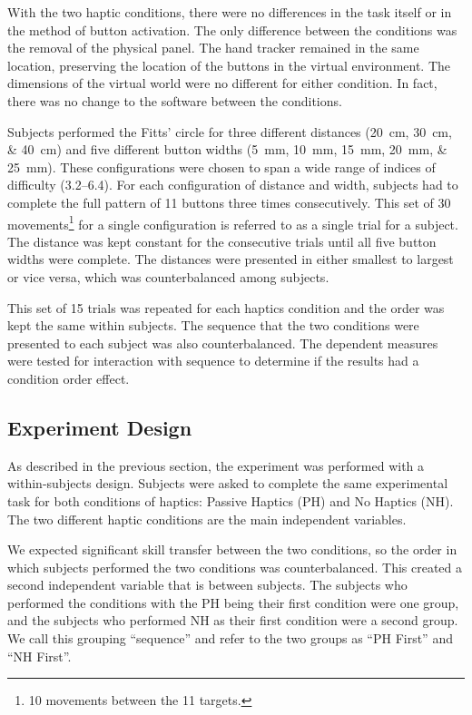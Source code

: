 With the two haptic conditions, there were no differences in the task itself or in the method of button activation.
The only difference between the conditions was the removal of the physical panel.
The hand tracker remained in the same location, preserving the location of the buttons in the virtual environment.
The dimensions of the virtual world were no different for either condition.
In fact, there was no change to the software between the conditions.

Subjects performed the Fitts' circle for three different distances (\SIlist{20;30;40}{\centi\meter}) and five different button widths (\SIlist{5;10;15;20;25}{\milli\meter}).
These configurations were chosen to span a wide range of indices of difficulty (\numrange{3.2}{6.4}).
For each configuration of distance and width, subjects had to complete the full pattern of 11 buttons three times consecutively.
This set of 30 movements\footnote{10 movements between the 11 targets.} for a single configuration is referred to as a single trial for a subject.
The distance was kept constant for the consecutive trials until all five button widths were complete.
The distances were presented in either smallest to largest or vice versa, which was counterbalanced among subjects.

This set of 15 trials was repeated for each haptics condition and the order was kept the same within subjects.
The sequence that the two conditions were presented to each subject was also counterbalanced.
The dependent measures were tested for interaction with sequence to determine if the results had a condition order effect.

\subsection{Experiment Design}

As described in the previous section, the experiment was performed with a within-subjects design.
Subjects were asked to complete the same experimental task for both conditions of haptics: Passive Haptics (PH) and No Haptics (NH).
The two different haptic conditions are the main independent variables.

We expected significant skill transfer between the two conditions, so the order in which subjects performed the two conditions was counterbalanced.
This created a second independent variable that is between subjects.
The subjects who performed the conditions with the PH being their first condition were one group, and the subjects who performed NH as their first condition were a second group.
We call this grouping ``sequence'' and refer to the two groups as ``PH First'' and ``NH First''.

